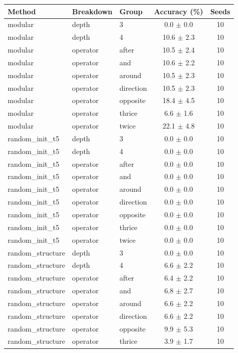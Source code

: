 \begin{longtable}{lllcc}
\toprule
Method & Breakdown & Group & Accuracy (\%) & Seeds \\
\midrule
\endhead
modular & depth & 3 & 0.0 $\pm$ 0.0 & 10 \\
modular & depth & 4 & 10.6 $\pm$ 2.3 & 10 \\
modular & operator & after & 10.5 $\pm$ 2.4 & 10 \\
modular & operator & and & 10.6 $\pm$ 2.2 & 10 \\
modular & operator & around & 10.5 $\pm$ 2.3 & 10 \\
modular & operator & direction & 10.5 $\pm$ 2.3 & 10 \\
modular & operator & opposite & 18.4 $\pm$ 4.5 & 10 \\
modular & operator & thrice & 6.6 $\pm$ 1.6 & 10 \\
modular & operator & twice & 22.1 $\pm$ 4.8 & 10 \\
random\_init\_t5 & depth & 3 & 0.0 $\pm$ 0.0 & 10 \\
random\_init\_t5 & depth & 4 & 0.0 $\pm$ 0.0 & 10 \\
random\_init\_t5 & operator & after & 0.0 $\pm$ 0.0 & 10 \\
random\_init\_t5 & operator & and & 0.0 $\pm$ 0.0 & 10 \\
random\_init\_t5 & operator & around & 0.0 $\pm$ 0.0 & 10 \\
random\_init\_t5 & operator & direction & 0.0 $\pm$ 0.0 & 10 \\
random\_init\_t5 & operator & opposite & 0.0 $\pm$ 0.0 & 10 \\
random\_init\_t5 & operator & thrice & 0.0 $\pm$ 0.0 & 10 \\
random\_init\_t5 & operator & twice & 0.0 $\pm$ 0.0 & 10 \\
random\_structure & depth & 3 & 0.0 $\pm$ 0.0 & 10 \\
random\_structure & depth & 4 & 6.6 $\pm$ 2.2 & 10 \\
random\_structure & operator & after & 6.4 $\pm$ 2.2 & 10 \\
random\_structure & operator & and & 6.8 $\pm$ 2.7 & 10 \\
random\_structure & operator & around & 6.6 $\pm$ 2.2 & 10 \\
random\_structure & operator & direction & 6.6 $\pm$ 2.2 & 10 \\
random\_structure & operator & opposite & 9.9 $\pm$ 5.3 & 10 \\
random\_structure & operator & thrice & 3.9 $\pm$ 1.7 & 10 \\

\end{longtable}
